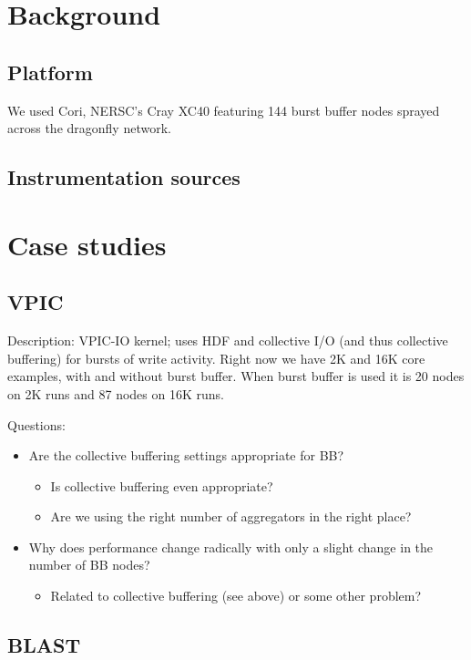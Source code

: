 \documentclass[conference,10pt,compsocconf]{IEEEtran}
\begin{document}
\section{Background}

\subsection{Platform}

We used Cori, NERSC's Cray XC40 featuring 144 burst buffer nodes sprayed
across the dragonfly network.

\subsection{Instrumentation sources}

\section{Case studies}

\subsection{VPIC}

Description: VPIC-IO kernel; uses HDF and collective I/O (and thus collective
buffering) for bursts of write activity.  Right now we have 2K and 16K core
examples, with and without burst buffer.  When burst buffer is used it is 20
nodes on 2K runs and 87 nodes on 16K runs.

Questions:
\begin{itemize}
\item Are the collective buffering settings appropriate for BB?
    \begin{itemize}
    \item Is collective buffering even appropriate?
    \item Are we using the right number of aggregators in the right place?
    \end{itemize}
\item Why does performance change radically with only a slight change in the
number of BB nodes?
    \begin{itemize}
    \item Related to collective buffering (see above) or some other problem?
    \end{itemize}
\end{itemize}

\subsection{BLAST}
\end{document}
